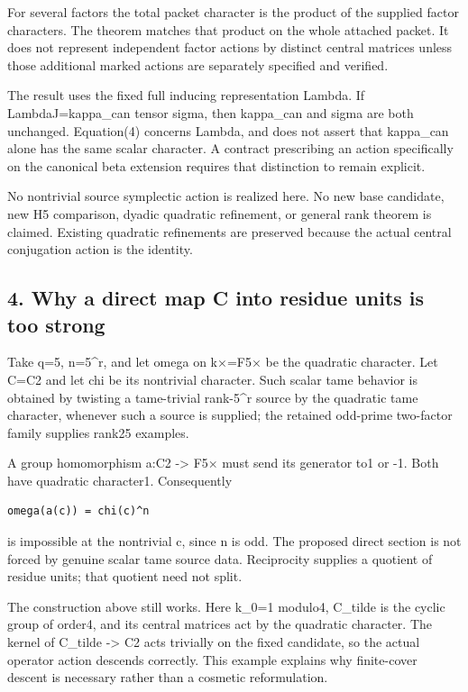 For several factors the total packet character is the product of the
supplied factor characters. The theorem matches that product on the
whole attached packet. It does not represent independent factor actions
by distinct central matrices unless those additional marked actions are
separately specified and verified.

The result uses the fixed full inducing representation Lambda. If
Lambda\textbar J=kappa\_can tensor sigma, then kappa\_can and sigma are
both unchanged. Equation(4) concerns Lambda, and does not assert that
kappa\_can alone has the same scalar character. A contract prescribing
an action specifically on the canonical beta extension requires that
distinction to remain explicit.

No nontrivial source symplectic action is realized here. No new base
candidate, new H5 comparison, dyadic quadratic refinement, or general
rank theorem is claimed. Existing quadratic refinements are preserved
because the actual central conjugation action is the identity.

\hypertarget{odd_scalar-why-a-direct-map-c-into-residue-units-is-too-strong}{%
\subsection{4. Why a direct map C into residue units is too
strong}\label{odd_scalar-why-a-direct-map-c-into-residue-units-is-too-strong}}

Take q=5, n=5\^{}r, and let omega on k×=F5× be the quadratic character.
Let C=C2 and let chi be its nontrivial character. Such scalar tame
behavior is obtained by twisting a tame-trivial rank-5\^{}r source by
the quadratic tame character, whenever such a source is supplied; the
retained odd-prime two-factor family supplies rank25 examples.

A group homomorphism a:C2 -\textgreater{} F5× must send its generator
to1 or -1. Both have quadratic character1. Consequently

\begin{Verbatim}[fontsize=\small,breaklines=true,breakanywhere=true]
omega(a(c)) = chi(c)^n
\end{Verbatim}

is impossible at the nontrivial c, since n is odd. The proposed direct
section is not forced by genuine scalar tame source data. Reciprocity
supplies a quotient of residue units; that quotient need not split.

The construction above still works. Here k\_0=1 modulo4, C\_tilde is the
cyclic group of order4, and its central matrices act by the quadratic
character. The kernel of C\_tilde -\textgreater{} C2 acts trivially on
the fixed candidate, so the actual operator action descends correctly.
This example explains why finite-cover descent is necessary rather than
a cosmetic reformulation.

